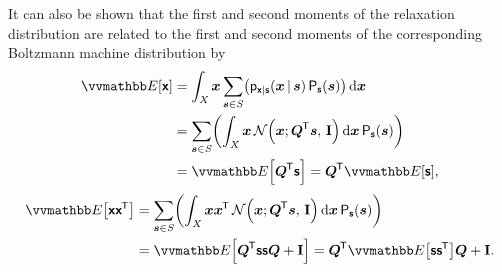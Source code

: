 \noindent
It can also be shown that the first and second moments of the relaxation distribution are related to the first and second moments of the corresponding Boltzmann machine distribution by
\begin{equation}
\begin{split}
  \expc{\rvct{x}} 
  &= \int_{\set{X}} \vct{x} \sum_{\vct{s}\in\set{S}} \lpa 
    \pden{\rvct{x}|\rvct{s}}(\vct{x} \gvn \vct{s}) \,\prob{\rvct{s}}(\vct{s})
  \rpa 
  \,\dr\vct{x} \\
  &= \sum_{\vct{s}\in\set{S}} \lpa 
    \int_{\set{X}} \vct{x} \,\nrm{\vct{x}; \mtx{Q}\tr\vct{s},\,\idmtx} \,\dr\vct{x}
    \,\prob{\rvct{s}}(\vct{s})
  \rpa \\
  &= \expc{
    \mtx{Q}\tr\rvct{s}
  }
  =
  \mtx{Q}\tr \expc{\rvct{s}},
\end{split}
\end{equation}
\begin{equation}
\begin{split}
  \expc{\rvct{x}\rvct{x}\tr} 
  &= \sum_{\vct{s}\in\set{S}} \lpa 
    \int_{\set{X}} \vct{x}\vct{x}\tr \,\nrm{\vct{x}; \mtx{Q}\tr\vct{s},\,\idmtx} \,\dr\vct{x}
    \,\prob{\rvct{s}}(\vct{s}) 
  \rpa\\
  &= \expc{\mtx{Q}\tr\rvct{s}\rvct{s}\mtx{Q} + \idmtx}
  = \mtx{Q}\tr\expc{\rvct{s}\rvct{s}\tr}\mtx{Q} + \idmtx.
\end{split}
\end{equation}